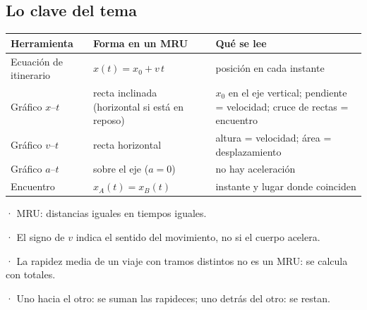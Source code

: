 \subsection{Lo clave del tema}
\begin{center}\small
\begin{tabularx}{\linewidth}{@{}>{\raggedright\arraybackslash\hsize=0.65\hsize}X>{\raggedright\arraybackslash\hsize=1.18\hsize}X>{\raggedright\arraybackslash\hsize=1.18\hsize}X@{}}
\toprule
\textbf{Herramienta} & \textbf{Forma en un MRU} & \textbf{Qué se lee} \\
\midrule
Ecuación de itinerario & $x(t) = x_0 + v\,t$ & posición en cada instante \\
Gráfico $x$--$t$ & recta inclinada (horizontal si está en reposo) & $x_0$ en el eje vertical; pendiente = velocidad; cruce de rectas = encuentro \\
Gráfico $v$--$t$ & recta horizontal & altura = velocidad; área = desplazamiento \\
Gráfico $a$--$t$ & sobre el eje ($a = 0$) & no hay aceleración \\
Encuentro & $x_A(t) = x_B(t)$ & instante y lugar donde coinciden \\
\bottomrule
\end{tabularx}
\end{center}
 
\begin{clave}[{Recuerda}] · MRU: distancias iguales en tiempos iguales.\par · El signo de $v$ indica el sentido del movimiento, no si el cuerpo acelera.\par · La rapidez media de un viaje con tramos distintos no es un MRU: se calcula con totales.\par · Uno hacia el otro: se suman las rapideces; uno detrás del otro: se restan.\end{clave}
 
